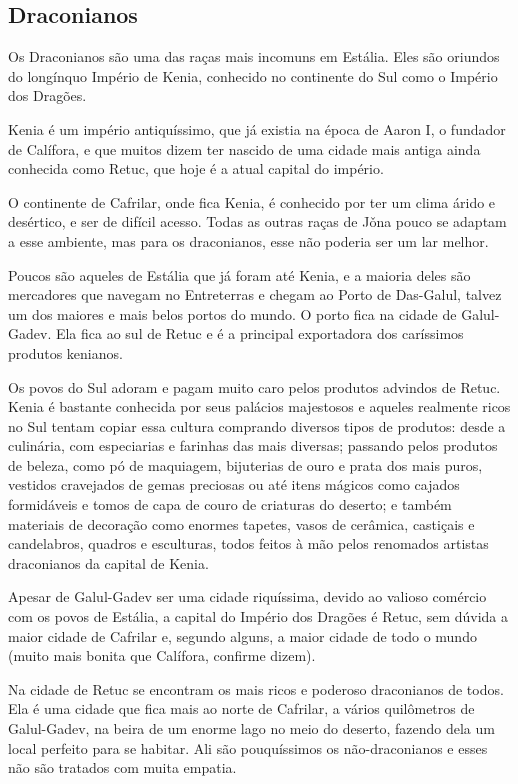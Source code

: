 \begin{multicols}{2}
\section{Draconianos}%

Os Draconianos são uma das raças mais incomuns em Estália. Eles são oriundos do
longínquo Império de Kenia, conhecido no continente do Sul como o Império dos
Dragões.

Kenia é um império antiquíssimo, que já existia na época de Aaron I, o fundador
de Calífora, e que muitos dizem ter nascido de uma cidade mais antiga ainda
conhecida como Retuc, que hoje é a atual capital do império.

O continente de Cafrilar, onde fica Kenia, é conhecido por ter um clima árido e
desértico, e ser de difícil acesso. Todas as outras raças de Jǒna pouco se
adaptam a esse ambiente, mas para os draconianos, esse não poderia ser um lar
melhor.

Poucos são aqueles de Estália que já foram até Kenia, e a maioria deles são
mercadores que navegam no Entreterras e chegam ao Porto de Das-Galul, talvez um
dos maiores e mais belos portos do mundo. O porto fica na cidade de Galul-Gadev.
Ela fica ao sul de Retuc e é a principal exportadora dos caríssimos produtos
kenianos.

Os povos do Sul adoram e pagam muito caro pelos produtos advindos de Retuc.
Kenia é bastante conhecida por seus palácios majestosos e aqueles realmente
ricos no Sul tentam copiar essa cultura comprando diversos tipos de produtos:
desde a culinária, com especiarias e farinhas das mais diversas; passando pelos
produtos de beleza, como pó de maquiagem, bijuterias de ouro e prata dos mais
puros, vestidos cravejados de gemas preciosas ou até itens mágicos como cajados
formidáveis e tomos de capa de couro de criaturas do deserto; e também materiais
de decoração como enormes tapetes, vasos de cerâmica, castiçais e candelabros,
quadros e esculturas, todos feitos à mão pelos renomados artistas draconianos da
capital de Kenia.

Apesar de Galul-Gadev ser uma cidade riquíssima, devido ao valioso comércio com
os povos de Estália, a capital do Império dos Dragões é Retuc, sem dúvida a
maior cidade de Cafrilar e, segundo alguns, a maior cidade de todo o mundo
(muito mais bonita que Calífora, confirme dizem).

Na cidade de Retuc se encontram os mais ricos e poderoso draconianos de todos.
Ela é uma cidade que fica mais ao norte de Cafrilar, a vários quilômetros de
Galul-Gadev, na beira de um enorme lago no meio do deserto, fazendo dela um
local perfeito para se habitar. Ali são pouquíssimos os não-draconianos e esses
não são tratados com muita empatia.


\end{multicols}

